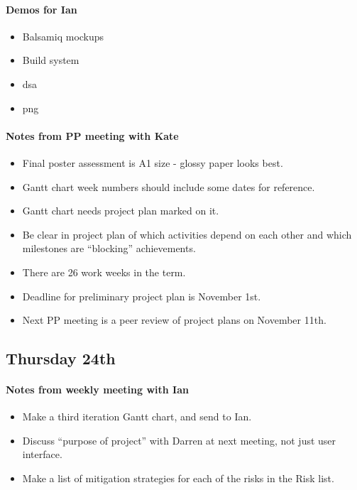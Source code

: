 \paragraph{Demos for Ian}
\begin{itemize}
\item Balsamiq mockups
\item Build system
\item dsa
\item png
\end{itemize}

\paragraph{Notes from PP meeting with Kate}
\begin{itemize}
\item Final poster assessment is A1 size - glossy paper looks best.
\item Gantt chart week numbers should include some dates for reference.
\item Gantt chart needs project plan marked on it.
\item Be clear in project plan of which activities depend on each other and
  which milestones are ``blocking'' achievements.
\item There are 26 work weeks in the term.
\item Deadline for preliminary project plan is November 1st.
\item Next PP meeting is a peer review of project plans on November 11th.
\end{itemize}

\subsection{Thursday 24th}
\paragraph{Notes from weekly meeting with Ian}
\begin{itemize}
\item Make a third iteration Gantt chart, and send to Ian.
\item Discuss ``purpose of project'' with Darren at next meeting, not just user
  interface.
\item Make a list of mitigation strategies for each of the risks in the Risk
  list.
\end{itemize}
